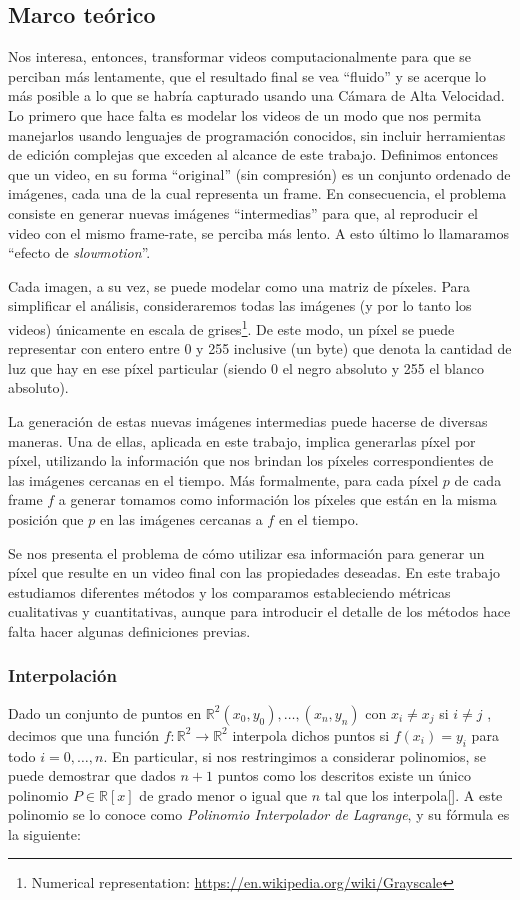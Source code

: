 \subsection{Marco teórico}
Nos interesa, entonces, transformar videos computacionalmente para que se perciban más lentamente, que el resultado final se vea ``fluido'' y se acerque lo más posible a lo que se habría capturado usando una Cámara de Alta Velocidad. Lo primero que hace falta es modelar los videos de un modo que nos permita manejarlos usando lenguajes de programación conocidos, sin incluir herramientas de edición complejas que exceden al alcance de este trabajo. Definimos entonces que un video, en su forma ``original'' (sin compresión) es un conjunto ordenado de imágenes, cada una de la cual representa un frame. En consecuencia, el problema consiste en generar nuevas imágenes ``intermedias'' para que, al reproducir el video con el mismo frame-rate, se perciba más lento. A esto \'ultimo lo llamaramos ``efecto de \emph{slowmotion}''.

Cada imagen, a su vez, se puede modelar como una matriz de píxeles. Para simplificar el análisis, consideraremos todas las imágenes (y por lo tanto los videos) únicamente en escala de grises\footnote{Numerical representation: \url{https://en.wikipedia.org/wiki/Grayscale}}. De este modo, un píxel se puede representar con entero entre 0 y 255 inclusive (un byte) que denota la cantidad de luz que hay en ese píxel particular (siendo 0 el negro absoluto y 255 el blanco absoluto).

La generación de estas nuevas imágenes intermedias puede hacerse de diversas maneras. Una de ellas, aplicada en este trabajo, implica generarlas píxel por píxel, utilizando la información que nos brindan los píxeles correspondientes de las imágenes cercanas en el tiempo. Más formalmente, para cada píxel $p$ de cada frame $f$ a generar tomamos como información los píxeles que están en la misma posición que $p$ en las imágenes cercanas a $f$ en el tiempo.

Se nos presenta el problema de cómo utilizar esa información para generar un píxel que resulte en un video final con las propiedades deseadas. En este trabajo estudiamos diferentes métodos y los comparamos estableciendo métricas cualitativas y cuantitativas, aunque para introducir el detalle de los métodos hace falta hacer algunas definiciones previas.

\subsubsection{Interpolación}
Dado un conjunto de puntos en $\mathbb{R}^2 (x_0, y_0), \ldots, (x_n, y_n)$ con $x_i \neq x_j$ si $i \neq j$ , decimos que una función $f:\mathbb{R}^2 \rightarrow \mathbb{R}^2$ interpola dichos puntos si $f(x_i) = y_i$ para todo $i = 0, \ldots, n$. En particular, si nos restringimos a considerar polinomios, se puede demostrar que dados $n + 1$ puntos como los descritos existe un único polinomio $P \in \mathbb{R}[x]$ de grado menor o igual que $n$ tal que los interpola[\cite{wiki_lagrange_polynomial}]. A este polinomio se lo conoce como \emph{Polinomio Interpolador de Lagrange}, y su fórmula es la siguiente:

